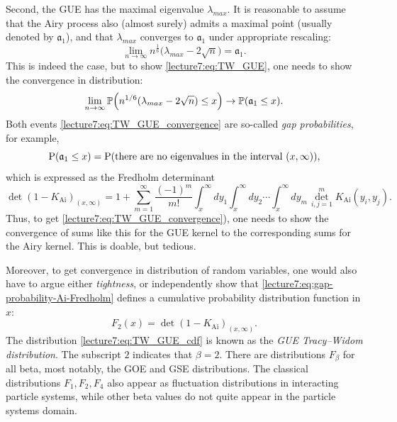 \documentclass[letterpaper,11pt,oneside,reqno]{book}
\numberwithin{equation}{chapter}  %
\newcommand{\ssp}{\hspace{1pt}}
\theoremstyle{definition}
\begin{document}
Second, the GUE has the maximal eigenvalue $\lambda_{max}$. It is reasonable
to assume that the Airy process also (almost surely) admits a maximal point
(usually denoted by $\mathfrak{a}_1$),
and that $\lambda_{max}$
converges to $\mathfrak{a}_1$ under appropriate rescaling:
\begin{equation}
	\label{lecture7:eq:TW_GUE}
	\lim_{n\to\infty}n^{\frac{1}{6}}\bigl(\lambda_{max}-2\sqrt{n}\bigr)=\mathfrak{a}_1.
\end{equation}
This is indeed the case, but to show \eqref{lecture7:eq:TW_GUE}, one needs to
show the convergence in distribution:
\begin{equation}
	\label{lecture7:eq:TW_GUE_convergence}
	\lim_{n\to \infty}
	\mathbb{P}\Bigl(n^{1/6}(\lambda_{max}-2\sqrt{n})\le x\Bigr)
	\to
	\mathbb{P}(\mathfrak{a}_1\le x).
\end{equation}
Both events \eqref{lecture7:eq:TW_GUE_convergence} are so-called
\emph{gap probabilities}, for example,
\begin{equation*}
	\operatorname{P}(\mathfrak{a}_1\le x)=
	\operatorname{P}(\textnormal{there are no eigenvalues in the interval $(x,\infty)$}),
\end{equation*}
which is expressed as
the Fredholm determinant
\begin{equation}
	\label{lecture7:eq:gap-probability-Ai-Fredholm}
	\det\left( 1-K_{\mathrm{Ai}} \right)_{(x,\infty)}=
	1+\sum_{m=1}^{\infty}\frac{(-1)^m}{m!}
	\int_x^{\infty}dy_1\int_x^{\infty}dy_2\cdots
	\int_x^{\infty}dy_m
	\ssp
	\det\limits_{i,j=1}^m
	K_{\mathrm{Ai}}(y_i,y_j).
\end{equation}
Thus, to get \eqref{lecture7:eq:TW_GUE_convergence}), one needs to show the convergence
of sums like this for the GUE kernel
to the corresponding sums for the Airy kernel. This is doable, but tedious.

Moreover, to get convergence in distribution of random variables,
one would also have to argue either \emph{tightness},
or independently show that
\eqref{lecture7:eq:gap-probability-Ai-Fredholm} defines a
cumulative probability
distribution function in $x$:
\begin{equation}
	\label{lecture7:eq:TW_GUE_cdf}
	F_2(x)=\det\left( 1-K_{\mathrm{Ai}} \right)_{(x,\infty)}.
\end{equation}
The distribution \eqref{lecture7:eq:TW_GUE_cdf} is known as the \emph{GUE Tracy--Widom distribution}.
The subscript $2$ indicates that $\beta=2$. There are distributions
$F_\beta$ for all beta, most notably, the GOE and GSE distributions.
The classical distributions $F_1,F_2,F_4$ also appear as fluctuation distributions
in interacting particle systems, while other beta values do
not quite appear in the particle systems
domain.
\end{document}

